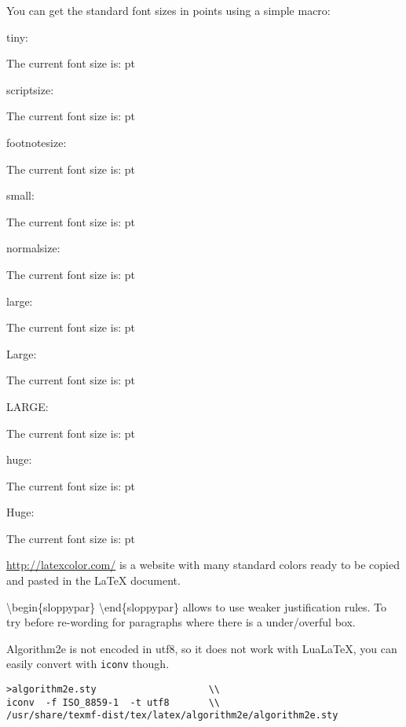 \documentclass[a4paper]{article}
\makeatletter
\newcommand\thefontsize[1]{{#1 The current font size is: \f@size pt\par}}
\makeatother
\begin{document}
You can get the standard font sizes in points using a simple macro:

tiny: \thefontsize\tiny
scriptsize: \thefontsize\scriptsize
footnotesize: \thefontsize\footnotesize
small: \thefontsize\small
normalsize: \thefontsize\normalsize
large: \thefontsize\large
Large: \thefontsize\Large
LARGE: \thefontsize\LARGE
huge: \thefontsize\huge
Huge: \thefontsize\Huge


\url{http://latexcolor.com/} is a website with many standard colors ready to be copied
and pasted in the \LaTeX{} document.

\textbackslash{}begin\{sloppypar\} \textbackslash{}end\{sloppypar\} allows to
use weaker justification rules. To try before re-wording for paragraphs where
there is a under/overful box.

Algorithm2e is not encoded in utf8, so it does not work with LuaLaTeX,
you can easily convert with \texttt{iconv} though.
\begin{verbatim}
>algorithm2e.sty                    \\
iconv  -f ISO_8859-1  -t utf8       \\
/usr/share/texmf-dist/tex/latex/algorithm2e/algorithm2e.sty 
\end{verbatim}
\end{document}
